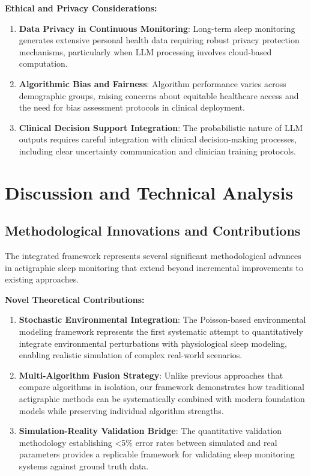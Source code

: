 \documentclass[conference]{IEEEtran}
\begin{document}
\textbf{Ethical and Privacy Considerations:}
\begin{enumerate}
    \item \textbf{Data Privacy in Continuous Monitoring}: Long-term sleep monitoring generates extensive personal health data requiring robust privacy protection mechanisms, particularly when LLM processing involves cloud-based computation.
    
    \item \textbf{Algorithmic Bias and Fairness}: Algorithm performance varies across demographic groups, raising concerns about equitable healthcare access and the need for bias assessment protocols in clinical deployment.
    
    \item \textbf{Clinical Decision Support Integration}: The probabilistic nature of LLM outputs requires careful integration with clinical decision-making processes, including clear uncertainty communication and clinician training protocols.
\end{enumerate}

\section{Discussion and Technical Analysis}
\subsection{Methodological Innovations and Contributions}
The integrated framework represents several significant methodological advances in actigraphic sleep monitoring that extend beyond incremental improvements to existing approaches.

\textbf{Novel Theoretical Contributions:}
\begin{enumerate}
    \item \textbf{Stochastic Environmental Integration}: The Poisson-based environmental modeling framework represents the first systematic attempt to quantitatively integrate environmental perturbations with physiological sleep modeling, enabling realistic simulation of complex real-world scenarios.
    
    \item \textbf{Multi-Algorithm Fusion Strategy}: Unlike previous approaches that compare algorithms in isolation, our framework demonstrates how traditional actigraphic methods can be systematically combined with modern foundation models while preserving individual algorithm strengths.
    
    \item \textbf{Simulation-Reality Validation Bridge}: The quantitative validation methodology establishing <5\% error rates between simulated and real parameters provides a replicable framework for validating sleep monitoring systems against ground truth data.
\end{enumerate}
\end{document}

